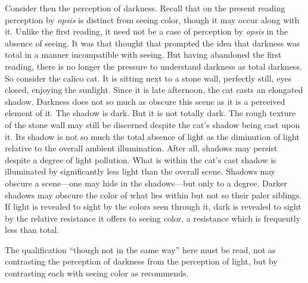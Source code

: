 
Consider then the perception of darkness. Recall that on the present reading perception by \emph{opsis} is distinct from seeing color, though it may occur along with it. Unlike the first reading, it need not be a case of perception by \emph{opsis} in the absence of seeing. It was that thought that prompted the idea that darkness was total in a manner incompatible with seeing. But having abandoned the first reading, there is no longer the pressure to understand darkness as total darkness. So consider the calico cat. It is sitting next to a stone wall, perfectly still, eyes closed, enjoying the sunlight. Since it is late afternoon, the cat casts an elongated shadow. Darkness does not so much as obscure this scene as it is a perceived element of it. The shadow is dark. But it is not totally dark. The rough texture of the stone wall may still be discerned despite the cat's shadow being cast upon it. Its shadow is not so much the total absence of light as the diminution of light relative to the overall ambient illumination. After all, shadows may persist despite a degree of light pollution. What is within the cat's cast shadow is illuminated by significantly less light than the overall scene. Shadows may obscure a scene—one may hide in the shadows—but only to a degree. Darker shadows may obscure the color of what lies within but not so their paler siblings. If light is revealed to sight by the colors seen through it, dark is revealed to sight by the relative resistance it offers to seeing color, a resistance which is frequently less than total.

The qualification ``though not in the same way'' here must be read, not as contrasting the perception of darkness from the perception of light, but by contrasting each with seeing color as \citet[275]{Ross:1961uq} recommends.

